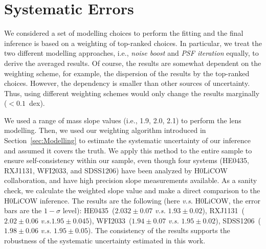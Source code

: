 \documentclass[fleqn,usenatbib]{mnras}
\begin{document}
{\section{Systematic Errors}\label{sec:diss}

We considered a set of modelling choices to perform the fitting and the final inference is based on a weighting of top-ranked choices. In particular, we treat the two different modelling approaches, i.e., {\it noise boost} and {\it PSF iteration} equally, to derive the averaged results. Of course, the results are somewhat dependent on the weighting scheme, for example, the dispersion of the results by the top-ranked choices. However, the dependency is smaller than other sources of uncertainty. Thus, using different weighting schemes would only change the results marginally ($<0.1$~dex).

We used a range of mass slope values (i.e., 1.9, 2.0, 2.1) to perform the lens modelling. Then, we used our weighting algorithm introduced in Section~\ref{sec:Modelling} to estimate the systematic uncertainty of our inference and assumed it covers the truth. We apply this method to the entire sample to ensure self-consistency within our sample, even though four systems (HE0435, RXJ1131, WFI2033, and SDSS1206) have been analyzed by H0LiCOW collaboration, and have high precision slope measurements available. As a sanity check, we calculate the weighted slope value and make a direct comparison to the H0LiCOW inference. The results are the following (here {\it v.s.} H0LiCOW, the error bars are the $1-\sigma$ level): HE0435~($2.032\pm 0.07$ {\it v.s.} $1.93\pm0.02$), RXJ1131~($2.02\pm 0.06$ {\it v.s.}$1.95\pm0.045$), WFI2033~($1.94\pm 0.07$ {\it v.s.} $1.95\pm0.02$), SDSS1206~($1.98\pm 0.06$ {\it v.s.} $1.95\pm0.05$). The consistency of the results supports the robustness of the systematic uncertainty estimated in this work.

}
\end{document}
